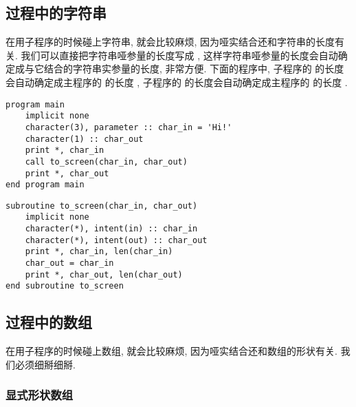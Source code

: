 \subsection{过程中的字符串} 

在用子程序的时候碰上字符串, 就会比较麻烦, 因为哑实结合还和字符串的长度有关. 我们可以直接把字符串哑参量的长度写成 \ttt{*}, 这样字符串哑参量的长度会自动确定成与它结合的字符串实参量的长度, 非常方便. 下面的程序中, 子程序的  的长度会自动确定成主程序的  的长度 , 子程序的  的长度会自动确定成主程序的  的长度 .
\begin{lstlisting}
program main
    implicit none
    character(3), parameter :: char_in = 'Hi!'
    character(1) :: char_out
    print *, char_in
    call to_screen(char_in, char_out)
    print *, char_out
end program main
\end{lstlisting}
\begin{lstlisting}
subroutine to_screen(char_in, char_out)
    implicit none
    character(*), intent(in) :: char_in
    character(*), intent(out) :: char_out
    print *, char_in, len(char_in)
    char_out = char_in
    print *, char_out, len(char_out)
end subroutine to_screen
\end{lstlisting}

\subsection{过程中的数组} 

在用子程序的时候碰上数组, 就会比较麻烦, 因为哑实结合还和数组的形状有关. 我们必须细掰细掰. 

\subsubsection{显式形状数组} 

